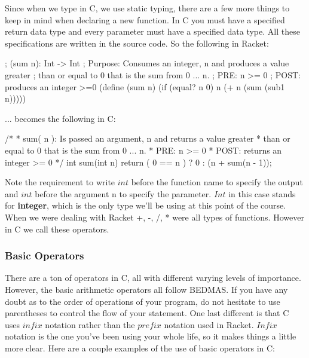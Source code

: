 
Since when we type in C, we use static typing, there are a few more things to keep in mind when declaring a new function.  In C you must have a specified return data type and every parameter must have a specified data type.  All these specifications are written in the source code.  So the following in Racket: \\

\begin{code}[Lisp]
; (sum n): Int -> Int
;	Purpose: Consumes an integer, n and produces a value greater
;	         than or equal to 0 that is the sum from 0 ... n.
; PRE: n >= 0
; POST: produces an integer >=0
(define (sum n)
	(if (equal? n 0) n (+ n (sum (sub1 n)))))
\end{code}

... becomes the following in C:\\

\begin{code}[C]
/*
 * sum( n ): Is passed an argument, n and returns a value greater
 *           than or equal to 0 that is the sum from 0 ... n.
 * PRE: n >= 0
 * POST: returns an integer >= 0
 */
int sum(int n) 
{
	return ( 0 == n ) ? 0 : (n + sum(n - 1));
}
\end{code}

Note the requirement to write $int$ before the function name to specify the output and $int$ before the argument n to specify the parameter.  $Int$ in this case stands for \textbf{integer}, which is the only type we'll be using at this point of the course.\\

When we were dealing with Racket +, -, /, * were all types of functions.  However in C we call these operators.

\subsubsection*{Basic Operators}

There are a ton of operators in C, all with different varying levels of importance.  However, the basic arithmetic operators all follow BEDMAS.  If you have any doubt as to the order of operations of your program, do not hesitate to use parentheses to control the flow of your statement.  One last different is that C uses $infix$ notation rather than the $prefix$ notation used in Racket.  $Infix$ notation is the one you've been using your whole life, so it makes things a little more clear.  Here are a couple examples of the use of basic operators in C:\\

